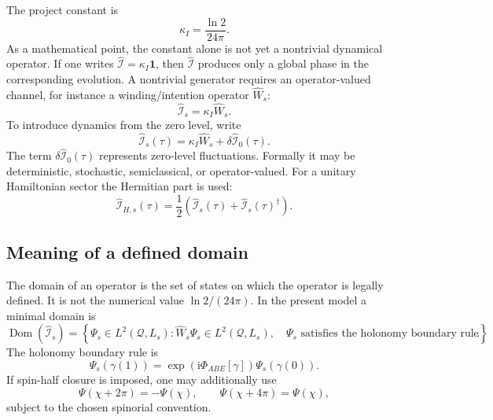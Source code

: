 \documentclass[11pt,a4paper]{article}
\newcommand{\ii}{\mathrm i}
\newcommand{\Q}{\mathcal Q}
\newcommand{\Iop}{\hat{\mathcal I}}
\newcommand{\Wop}{\hat W}
\newcommand{\kappaI}{\kappa_I}
\newcommand{\Dom}{\operatorname{Dom}}
\begin{document}
The project constant is
\begin{equation}
  \boxed{\kappaI=\frac{\ln2}{24\pi}.}
  \label{eq:kappa}
\end{equation}
As a mathematical point, the constant alone is not yet a nontrivial dynamical operator. If one writes $\Iop=\kappaI\mathbf 1$, then $\Iop$ produces only a global phase in the corresponding evolution. A nontrivial generator requires an operator-valued channel, for instance a winding/intention operator $\Wop_s$:
\begin{equation}
  \boxed{\Iop_s=\kappaI\Wop_s.}
  \label{eq:intention_operator_static}
\end{equation}
To introduce dynamics from the zero level, write
\begin{equation}
  \boxed{\Iop_s(\tau)=\kappaI\Wop_s+\delta\Iop_0(\tau).}
  \label{eq:intention_operator_dynamic}
\end{equation}
The term $\delta\Iop_0(\tau)$ represents zero-level fluctuations. Formally it may be deterministic, stochastic, semiclassical, or operator-valued. For a unitary Hamiltonian sector the Hermitian part is used:
\begin{equation}
  \Iop_{H,s}(\tau)=\frac12\left(\Iop_s(\tau)+\Iop_s(\tau)^\dagger\right).
\end{equation}

\subsection{Meaning of a defined domain}

The domain of an operator is the set of states on which the operator is legally defined. It is not the numerical value $\ln2/(24\pi)$. In the present model a minimal domain is
\begin{equation}
\boxed{
\Dom(\Iop_s)=
\left\{\Psi_s\in L^2(\Q,L_s):
\Wop_s\Psi_s\in L^2(\Q,L_s),\quad
\Psi_s\text{ satisfies the holonomy boundary rule}
\right\}.}
\label{eq:domain}
\end{equation}
The holonomy boundary rule is
\begin{equation}
  \Psi_s(\gamma(1))
  =\exp\left(\ii\Phi_{ABE}[\gamma]\right)\Psi_s(\gamma(0)).
  \label{eq:holonomy_boundary}
\end{equation}
If spin-half closure is imposed, one may additionally use
\begin{equation}
  \Psi(\chi+2\pi)=-\Psi(\chi),
  \qquad
  \Psi(\chi+4\pi)=\Psi(\chi),
  \label{eq:spin_half_boundary}
\end{equation}
subject to the chosen spinorial convention.
\end{document}
